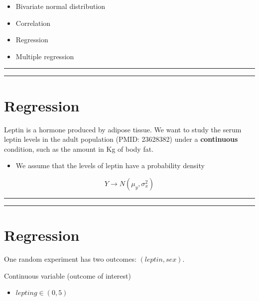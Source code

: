 \documentclass[
]{book}
\providecommand{\tightlist}{%
  \setlength{\itemsep}{0pt}\setlength{\parskip}{0pt}}
\begin{document}
\begin{itemize}
\tightlist
\item
  Bivariate normal distribution
\item
  Correlation
\item
  Regression
\item
  Multiple regression
\end{itemize}

\begin{center}\rule{0.5\linewidth}{0.5pt}\end{center}

\begin{center}\rule{0.5\linewidth}{0.5pt}\end{center}

\hypertarget{regression}{%
\section{Regression}\label{regression}}

Leptin is a hormone produced by adipose tissue. We want to study the serum leptin levels in the adult population (PMID: 23628382) under a \textbf{continuous} condition, such as the amount in Kg of body fat.

\begin{itemize}
\tightlist
\item
  We assume that the levels of leptin have a probability density
\end{itemize}

\[Y \rightarrow N(\mu_y, \sigma_x^2)\]

\begin{center}\rule{0.5\linewidth}{0.5pt}\end{center}

\begin{center}\rule{0.5\linewidth}{0.5pt}\end{center}

\hypertarget{regression-1}{%
\section{Regression}\label{regression-1}}

One random experiment has two outcomes: \((leptin, sex)\).

Continuous variable (outcome of interest)

\begin{itemize}
\tightlist
\item
  \(lepting \in (0, 5)\)
\end{itemize}
\end{document}
